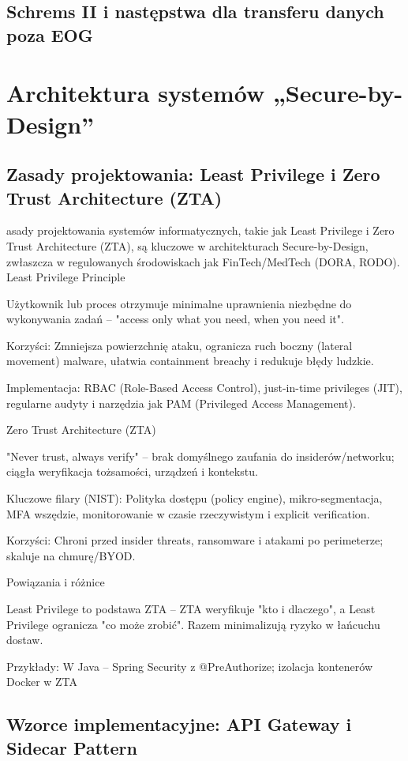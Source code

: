 \documentclass[12pt,a4paper,oneside]{book}
\begin{document}
\section{Schrems II i następstwa dla transferu danych poza EOG}

\chapter{Architektura systemów „Secure-by-Design”}

\section{Zasady projektowania: Least Privilege i Zero Trust Architecture (ZTA)}
asady projektowania systemów informatycznych, takie jak Least Privilege i Zero Trust Architecture (ZTA), są kluczowe w architekturach Secure-by-Design, zwłaszcza w regulowanych środowiskach jak FinTech/MedTech (DORA, RODO).
Least Privilege Principle

    Użytkownik lub proces otrzymuje minimalne uprawnienia niezbędne do wykonywania zadań – "access only what you need, when you need it".

    Korzyści: Zmniejsza powierzchnię ataku, ogranicza ruch boczny (lateral movement) malware, ułatwia containment breachy i redukuje błędy ludzkie.

    Implementacja: RBAC (Role-Based Access Control), just-in-time privileges (JIT), regularne audyty i narzędzia jak PAM (Privileged Access Management).​

Zero Trust Architecture (ZTA)

    "Never trust, always verify" – brak domyślnego zaufania do insiderów/networku; ciągła weryfikacja tożsamości, urządzeń i kontekstu.

    Kluczowe filary (NIST): Polityka dostępu (policy engine), mikro-segmentacja, MFA wszędzie, monitorowanie w czasie rzeczywistym i explicit verification.

    Korzyści: Chroni przed insider threats, ransomware i atakami po perimeterze; skaluje na chmurę/BYOD.​

Powiązania i różnice

    Least Privilege to podstawa ZTA – ZTA weryfikuje "kto i dlaczego", a Least Privilege ogranicza "co może zrobić". Razem minimalizują ryzyko w łańcuchu dostaw.

    Przykłady: W Java – Spring Security z @PreAuthorize; izolacja kontenerów Docker w ZTA
\section{Wzorce implementacyjne: API Gateway i Sidecar Pattern}
\end{document}
